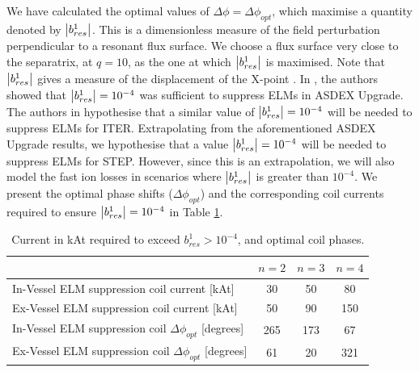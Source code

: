 \documentclass[10pt, a4paper, twoside]{article}
\begin{document}
We have calculated the optimal values of $\Delta \phi = \Delta \phi_{opt}$, which maximise a quantity denoted by $\abs{b^1_{res}}$. This is a dimensionless measure of the field perturbation perpendicular to a resonant flux surface. We choose a flux surface very close to the separatrix, at $q=10$, as the one at which $\abs{b^1_{res}}$ is maximised. 
Note that $\abs{b^1_{res}}$ gives a measure of the displacement of the X-point \cite{ryan2017}. In \cite{suttrop2018}, the authors showed that $\abs{b^1_{res}}=10^{-4}$ was sufficient to suppress ELMs in ASDEX Upgrade. The authors in \cite{liu2015} hypothesise that a similar value of $\abs{b^1_{res}}=10^{-4}$ will be needed to suppress ELMs for ITER. Extrapolating from the aforementioned ASDEX Upgrade results, we hypothesise that a value $\abs{b^1_{res}}=10^{-4}$ will be needed to suppress ELMs for STEP. However, since this is an extrapolation, we will also model the fast ion losses in scenarios where $\abs{b^1_{res}}$ is greater than $10^{-4}$. We present the optimal phase shifts ($\Delta \phi_{opt}$) and the corresponding coil currents required to ensure $\abs{b^1_{res}}=10^{-4}$ in Table \ref{table:optimum_currents_and_phases}. 
\begin{table}[h]
\centering
\begin{tabular}{lccc}
\hline
 & \( n=2 \) & \( n=3 \) & \( n=4 \) \\
\hline
In-Vessel ELM suppression coil current [kAt] & 30 & 50 & 80 \\
Ex-Vessel ELM suppression coil current [kAt] & 50 & 90 & 150 \\
In-Vessel ELM suppression coil \(\Delta\phi_{opt}\) [degrees] & 265 & 173 & 67 \\
Ex-Vessel ELM suppression coil \(\Delta\phi_{opt}\) [degrees] & 61 & 20 & 321 \\
\hline
\end{tabular}
\caption{Current in kAt required to exceed \( b^1_{res} > 10^{-4} \), and optimal coil phases.}
\label{table:optimum_currents_and_phases}
\end{table}
\end{document}
